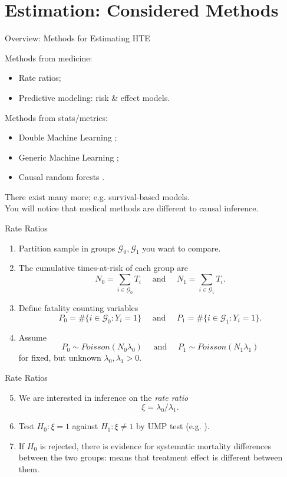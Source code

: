 \documentclass[11pt]{beamer}
\newcommand{\G}{\mathcal{G}}
\begin{document}
\section{Estimation: Considered Methods}


\begin{frame}{Overview: Methods for Estimating HTE}

Methods from medicine:
\begin{itemize}
\item Rate ratios;
\item Predictive modeling: risk \& effect models.\bigskip
\end{itemize}

Methods from stats/metrics:
\begin{itemize}
\item Double Machine Learning \citep{chernozhukov2018double};
\item Generic Machine Learning \citep{chernozhukov2020generic};
\item Causal random forests \citep{athey2019grf}.\bigskip
\end{itemize}

There exist many more; e.g. survival-based models.\\\medskip
You will notice that medical methods are different to causal inference.
\end{frame}


\begin{frame}{Rate Ratios}
\begin{enumerate}
	\item Partition sample in groups $\G_0, \G_1$ you want to compare.
	\item The cumulative times-at-risk of each group are
	\[
		N_0 = \sum_{i\in\G_0} T_i \quad \text{ and } \quad N_1 = \sum_{i\in\G_1} T_i.
	\]
	\item Define fatality counting variables 
	\[
		P_0 = \# \{i \in \G_0 : Y_i = 1\} \quad \text{ and } \quad P_1 = \# \{i \in \G_1 : Y_i = 1\}.
	\] 
	\item Assume
	\[
		P_0\sim Poisson(N_0\lambda_0) \quad \text{ and } \quad P_1\sim Poisson(N_1\lambda_1)
	\]
	for fixed, but unknown $\lambda_0,\lambda_1 > 0$.
\end{enumerate}
\end{frame}


\begin{frame}{Rate Ratios}
\begin{enumerate}\setcounter{enumi}{4}
	\item We are interested in inference on the \textit{rate ratio}
	\[
		\xi = \lambda_0 \big/ \lambda_1.
	\]
	\item Test $H_0: \xi = 1$ against $H_1: \xi \neq 1$ by UMP test (e.g. \citealp{lehmann1986}).
	\item If $H_0$ is rejected, there is evidence for systematic mortality differences between the two groups: means that treatment effect is different between them.
\end{enumerate}
\end{frame}
\end{document}
